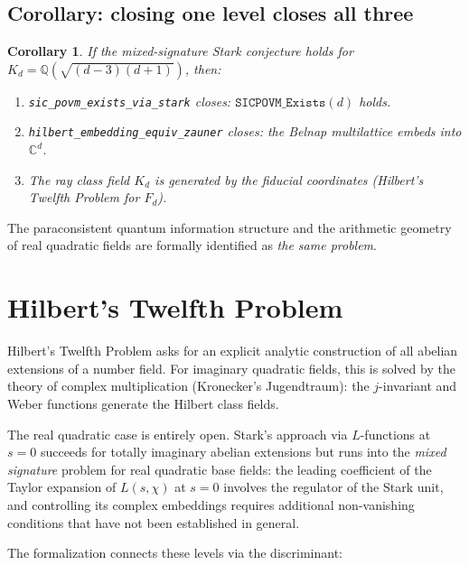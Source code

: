 \documentclass[12pt,a4paper]{article}
\newtheorem{corollary}[theorem]{Corollary}
\newcommand{\Kd}{K_d}
\begin{document}
\subsection{Corollary: closing one level closes all three}

\begin{corollary}
\label{cor:chain}
If the mixed-signature Stark conjecture holds for $\Kd = \mathbb{Q}(\sqrt{(d-3)(d+1)})$,
then:
\begin{enumerate}[label=(\roman*)]
  \item \texttt{sic\_povm\_exists\_via\_stark} closes: $\texttt{SICPOVM\_Exists}(d)$ holds.
  \item \texttt{hilbert\_embedding\_equiv\_zauner} closes: the Belnap multilattice embeds into $\mathbb{C}^d$.
  \item The ray class field $\Kd$ is generated by the fiducial coordinates
    (Hilbert's Twelfth Problem for $F_d$).
\end{enumerate}
\end{corollary}

The paraconsistent quantum information structure and the arithmetic geometry
of real quadratic fields are formally identified as \emph{the same problem}.

\section{Hilbert's Twelfth Problem}
\label{sec:hilbert12}

Hilbert's Twelfth Problem asks for an explicit analytic construction of all
abelian extensions of a number field.  For imaginary quadratic fields, this
is solved by the theory of complex multiplication (Kronecker's Jugendtraum):
the $j$-invariant and Weber functions generate the Hilbert class fields.

The real quadratic case is entirely open.  Stark's approach \cite{Stark1980}
via $L$-functions at $s=0$ succeeds for totally imaginary abelian extensions
but runs into the \emph{mixed signature} problem for real quadratic base fields:
the leading coefficient of the Taylor expansion of $L(s,\chi)$ at $s=0$ involves
the regulator of the Stark unit, and controlling its complex embeddings requires
additional non-vanishing conditions that have not been established in general.

The formalization connects these levels via the discriminant:
\end{document}
